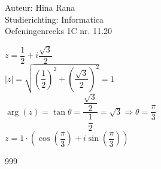 \documentclass[a4paper]{article}
\begin{document}
\noindent \large Auteur: Hina Rana \\
\noindent \large Studierichting: Informatica\\
\noindent \large Oefeningenreeks 1C nr. 11.20\\

\medskip

\normalsize

$z = \dfrac{1}{2} + i \dfrac{\sqrt{3}}{2}$ \\

$|z| = \sqrt{\left(\dfrac{1}{2}\right)^2 + \left(\dfrac{\sqrt{3}}{2}\right)^2} = 1$ \\

$\arg(z) = \tan \theta = \dfrac{\dfrac{\sqrt{3}}{2}}{\dfrac{1}{2}} = \sqrt{3} \Rightarrow \theta = \dfrac{\pi}{3}$ \\

$z = 1 \cdot \left(\cos\left(\dfrac{\pi}{3}\right) + i \sin\left(\dfrac{\pi}{3}\right)\right)$


\begin{thebibliography}{999}
\end{thebibliography}
\end{document}
